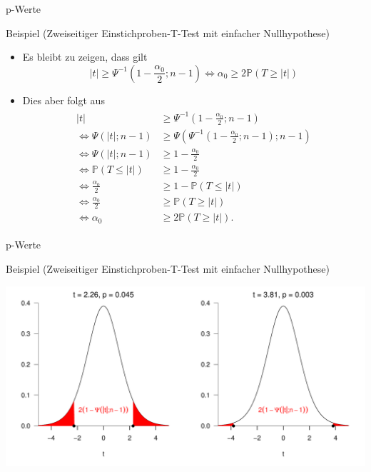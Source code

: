 \documentclass[
  8pt,
  ignorenonframetext,
]{beamer}
\begin{document}
\begin{frame}{p-Werte}
\protect\hypertarget{p-werte-2}{}
\small

Beispiel (Zweiseitiger Einstichproben-T-Test mit einfacher
Nullhypothese)

\footnotesize

\begin{itemize}
\item
  \itemsep2mm \justifying Es bleibt zu zeigen, dass gilt
  \begin{equation}
  |t| \ge \Psi^{-1}(1- \frac{\alpha_0}{2}; n-1)
  \Leftrightarrow
  \alpha_0 \ge 2 \mathbb{P}(T \ge |t|)
  \end{equation}
\item
  Dies aber folgt aus \footnotesize \vspace{-2mm} \begin{align}
  \begin{split}
  |t|
  & \ge \Psi^{-1}\left(1 - \frac{\alpha_0}{2}; n-1\right)
  \\\Leftrightarrow
  \Psi(|t|; n-1)
  & \ge \Psi\left(\Psi^{-1}\left(1 - \frac{\alpha_0}{2}; n-1\right); n-1\right)
  \\\Leftrightarrow
  \Psi(|t|; n-1)
  & \ge 1 - \frac{\alpha_0}{2}
  \\\Leftrightarrow
  \mathbb{P}(T \le |t|)
  & \ge 1 - \frac{\alpha_0}{2}
  \\\Leftrightarrow
  \frac{\alpha_0}{2}
  & \ge 1 - \mathbb{P}(T \le |t|)
  \\\Leftrightarrow
  \frac{\alpha_0}{2}
  & \ge \mathbb{P}(T \ge |t|)
  \\\Leftrightarrow
  \alpha_0
  & \ge 2 \mathbb{P}(T \ge |t|).
  \end{split}
  \end{align}
\end{itemize}
\end{frame}

\begin{frame}{p-Werte}
\protect\hypertarget{p-werte-3}{}
\small

Beispiel (Zweiseitiger Einstichproben-T-Test mit einfacher
Nullhypothese) \vspace{8mm}

\vspace{3mm}

\begin{center}\includegraphics[width=1\linewidth]{12_Abbildungen/wtfi_12_p_werte} \end{center}
\end{frame}
\end{document}
